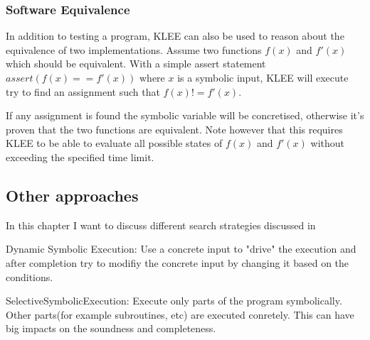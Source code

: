 \subsubsection{Software Equivalence}\label{section:software_equivalence}
In addition to testing a program, KLEE can also be used to reason about the equivalence of two implementations. Assume two functions $f(x)$ and $f'(x)$ which should be equivalent. With a simple assert statement $assert(f(x) == f'(x))$ where $x$ is a symbolic input, KLEE will execute try to find an assignment such that $f(x) != f'(x)$.

If any assignment is found the symbolic variable will be concretised, otherwise it's proven that the two functions are equivalent. Note however that this requires KLEE to be able to evaluate all possible states of $f(x)$ and $f'(x)$ without exceeding the specified time limit.
\subsection{Other approaches}
In this chapter I want to discuss different search strategies discussed in \cite{SurveySymExec-CSUR18}

Dynamic Symbolic Execution: Use a concrete input to "drive" the execution and after completion try to modifiy the concrete input by changing it based on the conditions. \cite{Godefroid:2005:DDA:1064978.1065036}

SelectiveSymbolicExecution: Execute only parts of the program symbolically. Other parts(for example subroutines, etc) are executed conretely. This can have big impacts on the soundness and completeness. \cite{Chipounov:2012:SPD:2110356.2110358}
